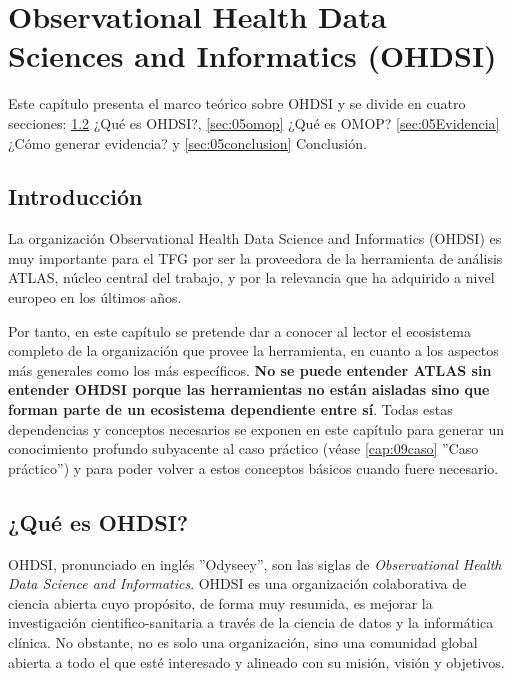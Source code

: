 \chapter{Observational Health Data Sciences and Informatics (OHDSI)}\label{cap:05OHDSI}

Este capítulo presenta el marco teórico sobre OHDSI y se divide en cuatro secciones:  %
\ref{sec:05OHDSI} ¿Qué es OHDSI?, \ref{sec:05omop} ¿Qué es OMOP? \ref{sec:05Evidencia} ¿Cómo generar evidencia? y \ref{sec:05conclusion} Conclusión.

\section{Introducción} \label{sec:05intro}

La organización Observational Health Data Science and Informatics (OHDSI) es muy importante para el TFG por ser la proveedora de la herramienta de análisis ATLAS, núcleo central del trabajo, y por la relevancia que ha adquirido a nivel europeo en los últimos años.

Por tanto, en este capítulo se pretende dar a conocer al lector el ecosistema completo de la organización que provee la herramienta, en cuanto a los aspectos más generales como los más específicos. \textbf{No se puede entender ATLAS sin entender OHDSI porque las herramientas no están aisladas sino que forman parte de un ecosistema dependiente entre sí}. Todas estas dependencias y conceptos necesarios se exponen en este capítulo para generar un conocimiento profundo subyacente al caso práctico (véase \ref{cap:09caso} ''Caso práctico'') y para poder volver a estos conceptos básicos cuando fuere necesario.

\section{¿Qué es OHDSI?} \label{sec:05OHDSI}

OHDSI, pronunciado en inglés ''Odyseey'', son las siglas de \textit{Observational Health Data Science and Informatics}. OHDSI es una organización colaborativa de ciencia abierta cuyo propósito, de forma muy resumida, es mejorar la investigación cientifico-sanitaria a través de la ciencia de datos y la informática clínica. No obstante, no es solo una organización, sino una comunidad global abierta a todo el que esté interesado y alineado con su misión, visión y objetivos. 

